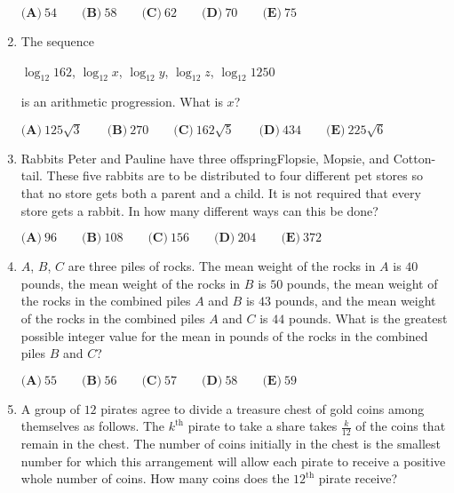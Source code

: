 \documentclass{article}
\begin{document}
\begin{enumerate}[label=\arabic*., itemsep=0.5em]
\( \textbf{(A)} \ 54 \qquad \textbf{(B)} \ 58 \qquad  \textbf{(C)} \ 62 \qquad \textbf{(D)} \ 70 \qquad \textbf{(E)} \ 75 \)\par \vspace{0.5em}\item The sequence

\(\log_{12}{162}\), \(\log_{12}{x}\), \(\log_{12}{y}\), \(\log_{12}{z}\), \(\log_{12}{1250}\)

is an arithmetic progression. What is \(x\)?

\( \textbf{(A)} \ 125\sqrt{3} \qquad \textbf{(B)} \ 270 \qquad \textbf{(C)} \ 162\sqrt{5} \qquad \textbf{(D)} \ 434 \qquad \textbf{(E)} \ 225\sqrt{6}\)\par \vspace{0.5em}\item Rabbits Peter and Pauline have three offspringFlopsie, Mopsie, and Cotton-tail. These five rabbits are to be distributed to four different pet stores so that no store gets both a parent and a child. It is not required that every store gets a rabbit. In how many different ways can this be done?

\(\textbf{(A)} \ 96 \qquad  \textbf{(B)} \ 108 \qquad  \textbf{(C)} \ 156 \qquad  \textbf{(D)} \ 204 \qquad  \textbf{(E)} \ 372 \)\par \vspace{0.5em}\item \(A\), \(B\), \(C\) are three piles of rocks. The mean weight of the rocks in \(A\) is \(40\) pounds, the mean weight of the rocks in \(B\) is \(50\) pounds, the mean weight of the rocks in the combined piles \(A\) and \(B\) is \(43\) pounds, and the mean weight of the rocks in the combined piles \(A\) and \(C\) is \(44\) pounds. What is the greatest possible integer value for the mean in pounds of the rocks in the combined piles \(B\) and \(C\)?

\( \textbf{(A)} \ 55 \qquad \textbf{(B)} \ 56 \qquad \textbf{(C)} \ 57 \qquad \textbf{(D)} \ 58 \qquad \textbf{(E)} \ 59\)\par \vspace{0.5em}\item A group of \( 12 \) pirates agree to divide a treasure chest of gold coins among themselves as follows. The \( k^\text{th} \) pirate to take a share takes \( \frac{k}{12} \) of the coins that remain in the chest. The number of coins initially in the chest is the smallest number for which this arrangement will allow each pirate to receive a positive whole number of coins. How many coins does the \( 12^{\text{th}} \) pirate receive?


\end{enumerate}
\end{document}

